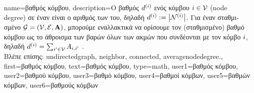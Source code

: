 {name={\foreignlanguage{greek}{βαθμός κόμβου}},
	description={\foreignlanguage{greek}{Ο βαθμός $d^{(i)}$ ενός 
		κόμβου} 
		$i \in \mathcal{V}$ (node degree) \foreignlanguage{greek}{σε έναν}  
		\foreignlanguage{greek}{είναι ο αριθμός των}   
		\foreignlanguage{greek}{του, δηλαδή} $d^{(i)} := \big|\mathcal{N}^{(i)}\big|$.
		\foreignlanguage{greek}{Για έναν σταθμισμένο}  $\mathcal{G}=(\mathcal{V},\mathcal{E},{\bf A})$, 
		\foreignlanguage{greek}{μπορούμε εναλλακτικά να ορίσουμε τον (σταθμισμένο) βαθμό κόμβου ως το άθροισμα 
		των βαρών όλων των ακμών που συνδέονται με τον κόμβο $i$, δηλαδή}
		$d^{(i)} = \sum_{i' \in \mathcal{V}} A_{i,i'}$ \cite{OPSAHL2010245}.
		\\
		\foreignlanguage{greek}{Βλέπε επίσης:} \gls{undirectedgraph}, \gls{neighbor}, \gls{connected}, \gls{averagenodedegree}.},
	first={\foreignlanguage{greek}{βαθμός κόμβου}},
	text={\foreignlanguage{greek}{βαθμός κόμβου}},
	type=math,
	user1={\foreignlanguage{greek}{βαθμός κόμβου}}, %
  	user2={\foreignlanguage{greek}{βαθμού κόμβου}}, %
	user3={\foreignlanguage{greek}{βαθμό κόμβου}}, %
  	user4={\foreignlanguage{greek}{βαθμοί κόμβων}}, %
	user5={\foreignlanguage{greek}{βαθμών κόμβων}}, %
  	user6={\foreignlanguage{greek}{βαθμούς κόμβων}} %
}

